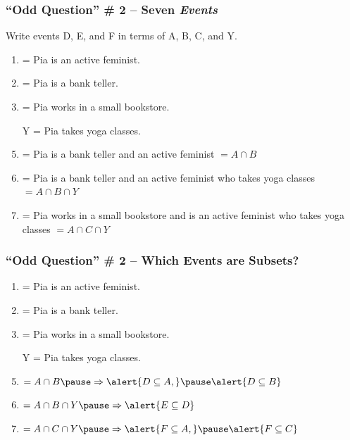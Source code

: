 \documentclass[handout]{beamer}
\begin{document}
\begin{frame}
\frametitle{``Odd Question'' \# 2 -- Seven \emph{Events}}
Write events D, E, and F in terms of A, B, C, and Y.
		\begin{enumerate}[A]
			\item = Pia is an active feminist.
			\item = Pia is a bank teller.
			\item = Pia works in a small bookstore.
			\item[Y] = Pia takes yoga classes.\vspace{2em}
			\item = Pia is a bank teller and an active feminist \pause \alert{$= A\cap B$}\pause
			\item = Pia is a bank teller and an active feminist who takes yoga classes \pause \alert{$= A \cap B \cap Y$} \pause
			\item = Pia works in a small bookstore and is an active feminist who takes yoga classes \pause \alert{$= A \cap C \cap Y$}
		\end{enumerate}
\end{frame}
\begin{frame}
\frametitle{``Odd Question'' \# 2 -- Which Events are Subsets?}
		\begin{enumerate}[A]
			\item = Pia is an active feminist.
			\item = Pia is a bank teller.
			\item = Pia works in a small bookstore.
			\item[Y] = Pia takes yoga classes.\vspace{2em}
			\item $=A\cap B \pause \Rightarrow \alert{D\subseteq A,} \pause \alert{D\subseteq B}$\pause
			\item $=A\cap B \cap Y\pause\Rightarrow \alert{E\subseteq D}$\pause
			\item $=A\cap C \cap Y \pause \Rightarrow \alert{F \subseteq A,} \pause\alert{F \subseteq C}$
		\end{enumerate}
\end{frame}
\end{document}
